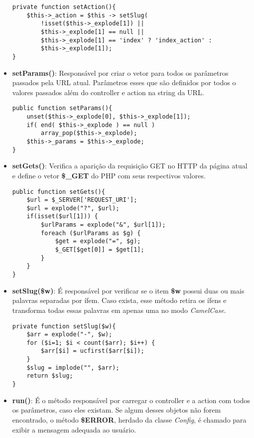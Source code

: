 \begin{itemize}
\begin{lstlisting}
private function setAction(){
    $this->_action = $this -> setSlug(
        !isset($this->_explode[1]) ||
        $this->_explode[1] == null ||
        $this->_explode[1] == 'index' ? 'index_action' :
        $this->_explode[1]);
}
\end{lstlisting}

                \item\textbf{setParams()}: Responsável por criar o vetor para todos os parâmetros passados pela URL atual. Parâmetros esses que são definidos por todos o valores passados além do controller e action na string da URL.

\begin{lstlisting}
public function setParams(){
    unset($this->_explode[0], $this->_explode[1]);
    if( end( $this->_explode ) == null )
        array_pop($this->_explode);
    $this->_params = $this->_explode;
}
\end{lstlisting}

                \item\textbf{setGets()}: Verifica a aparição da requisição GET no HTTP da página atual e define o vetor \textbf{\$\_GET} do PHP com seus respectivos valores.

\begin{lstlisting}
public function setGets(){
    $url = $_SERVER['REQUEST_URI'];
    $url = explode("?", $url);
    if(isset($url[1])) {
        $urlParams = explode("&", $url[1]);
        foreach ($urlParams as $g) {
            $get = explode("=", $g);
            $_GET[$get[0]] = $get[1];
        }
    }
}
\end{lstlisting}

                \item\textbf{setSlug(\$w)}: É responsável por verificar se o item \textbf{\$w} possui duas ou mais palavras separadas por ífem. Caso exista, esse método retira os ífens e transforma todas essas palavras em apenas uma no modo \emph{CamelCase}.

\begin{lstlisting}
private function setSlug($w){
    $arr = explode("-", $w);
    for ($i=1; $i < count($arr); $i++) {
        $arr[$i] = ucfirst($arr[$i]);
    }
    $slug = implode("", $arr);
    return $slug;
}
\end{lstlisting}

                \item\textbf{run()}: É o método responsável por carregar o controller e a action com todos os parâmetros, caso eles existam. Se algum desses objetos não forem encontrado, o método \textbf{\$ERROR}, herdado da classe \emph{Config}, é chamado para exibir a mensagem adequada ao usuário.

            \end{itemize}



